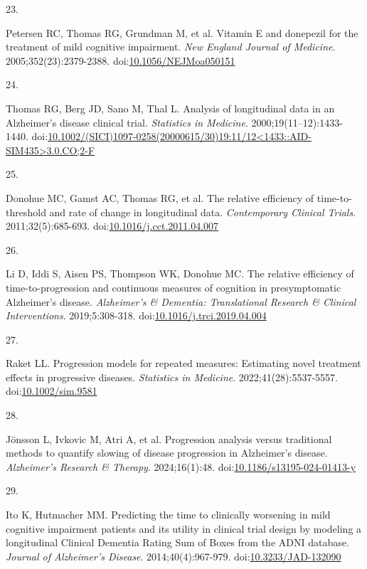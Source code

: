\documentclass[
  11pt,
]{article}
\newlength{\cslhangindent}
\newlength{\csllabelwidth}
\newenvironment{CSLReferences}[2] %
 {\begin{list}{}{%
  \setlength{\itemindent}{0pt}
  \setlength{\leftmargin}{0pt}
  \setlength{\parsep}{0pt}
  \ifodd #1
   \setlength{\leftmargin}{\cslhangindent}
   \setlength{\itemindent}{-1\cslhangindent}
  \fi
  \setlength{\itemsep}{#2\baselineskip}}}
 {\end{list}}
\newcommand{\CSLLeftMargin}[1]{\parbox[t]{\csllabelwidth}{\strut#1\strut}}
\newcommand{\CSLRightInline}[1]{\parbox[t]{\linewidth - \csllabelwidth}{\strut#1\strut}}
\begin{document}
\begin{CSLReferences}{0}{1}
\CSLLeftMargin{23. }%
\CSLRightInline{{Petersen RC, Thomas RG, Grundman M, et al.} Vitamin {E} and donepezil for the treatment of mild cognitive impairment. \emph{New England Journal of Medicine}. 2005;352(23):2379-2388. doi:\href{https://doi.org/10.1056/NEJMoa050151}{10.1056/NEJMoa050151}}

\CSLLeftMargin{24. }%
\CSLRightInline{Thomas RG, Berg JD, Sano M, Thal L. Analysis of longitudinal data in an {Alzheimer's} disease clinical trial. \emph{Statistics in Medicine}. 2000;19(11--12):1433-1440. doi:\href{https://doi.org/10.1002/(SICI)1097-0258(20000615/30)19:11/12\%3C1433::AID-SIM435\%3E3.0.CO;2-F}{10.1002/(SICI)1097-0258(20000615/30)19:11/12\textless1433::AID-SIM435\textgreater3.0.CO;2-F}}

\CSLLeftMargin{25. }%
\CSLRightInline{Donohue MC, Gamst AC, Thomas RG, et al. The relative efficiency of time-to-threshold and rate of change in longitudinal data. \emph{Contemporary Clinical Trials}. 2011;32(5):685-693. doi:\href{https://doi.org/10.1016/j.cct.2011.04.007}{10.1016/j.cct.2011.04.007}}

\CSLLeftMargin{26. }%
\CSLRightInline{Li D, Iddi S, Aisen PS, Thompson WK, Donohue MC. The relative efficiency of time-to-progression and continuous measures of cognition in presymptomatic {Alzheimer's} disease. \emph{Alzheimer's \& Dementia: Translational Research \& Clinical Interventions}. 2019;5:308-318. doi:\href{https://doi.org/10.1016/j.trci.2019.04.004}{10.1016/j.trci.2019.04.004}}

\CSLLeftMargin{27. }%
\CSLRightInline{Raket LL. Progression models for repeated measures: Estimating novel treatment effects in progressive diseases. \emph{Statistics in Medicine}. 2022;41(28):5537-5557. doi:\href{https://doi.org/10.1002/sim.9581}{10.1002/sim.9581}}

\CSLLeftMargin{28. }%
\CSLRightInline{Jönsson L, Ivkovic M, Atri A, et al. Progression analysis versus traditional methods to quantify slowing of disease progression in {Alzheimer's} disease. \emph{Alzheimer's Research \& Therapy}. 2024;16(1):48. doi:\href{https://doi.org/10.1186/s13195-024-01413-y}{10.1186/s13195-024-01413-y}}

\CSLLeftMargin{29. }%
\CSLRightInline{Ito K, Hutmacher MM. Predicting the time to clinically worsening in mild cognitive impairment patients and its utility in clinical trial design by modeling a longitudinal {Clinical Dementia Rating Sum of Boxes} from the {ADNI} database. \emph{Journal of Alzheimer's Disease}. 2014;40(4):967-979. doi:\href{https://doi.org/10.3233/JAD-132090}{10.3233/JAD-132090}}


\end{CSLReferences}
\end{document}
